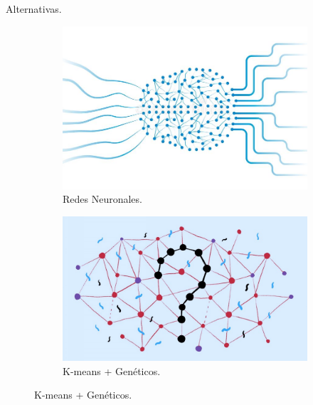 \begin{frame}[fragile]{Alternativas.}{}
  \begin{figure}
    \centering
    \begin{subfigure}[b]{0.3\textwidth}
      \includegraphics[width=\textwidth]{./Imagenes/RedNeuronal.jpg}
      \caption*{Redes Neuronales.}
    \end{subfigure}
    \begin{subfigure}[b]{0.3\textwidth}
      \includegraphics[width=\textwidth]{./Imagenes/Geneticos.jpeg}
      \caption*{K-means + Genéticos.}
    \end{subfigure}
  \end{figure}
\end{frame}

